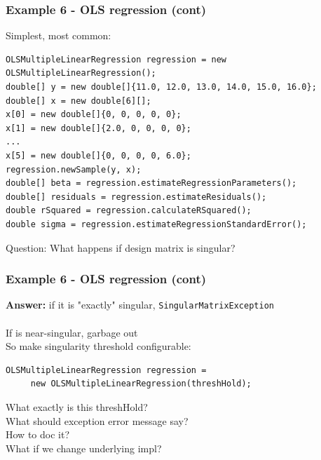 \documentclass[14pt,mathserif]{beamer}
\begin{document}
\begin{frame}[fragile]
  \frametitle{Example 6 - OLS regression (cont)}

\begin{small}
Simplest, most common:
\begin{verbatim}
OLSMultipleLinearRegression regression = new OLSMultipleLinearRegression();
double[] y = new double[]{11.0, 12.0, 13.0, 14.0, 15.0, 16.0};
double[] x = new double[6][];
x[0] = new double[]{0, 0, 0, 0, 0};
x[1] = new double[]{2.0, 0, 0, 0, 0};
...
x[5] = new double[]{0, 0, 0, 0, 6.0};          
regression.newSample(y, x);
double[] beta = regression.estimateRegressionParameters();       
double[] residuals = regression.estimateResiduals();
double rSquared = regression.calculateRSquared();
double sigma = regression.estimateRegressionStandardError();
\end{verbatim}
\end{small}
Question:  What happens if design matrix is singular?
\end{frame}

\begin{frame}[fragile]
  \frametitle{Example 6 - OLS regression (cont)}

\begin{small}
\textbf{Answer:} if it is "exactly" singular, \texttt{SingularMatrixException}
\\~\\
If is near-singular, garbage out \\
So make singularity threshold configurable:
\begin{verbatim}
OLSMultipleLinearRegression regression =
     new OLSMultipleLinearRegression(threshHold);
\end{verbatim}
What exactly is this threshHold? \\
What should exception error message say? \\
How to doc it? \\
What if we change underlying impl?
\end{small}
\end{frame}
\end{document}
